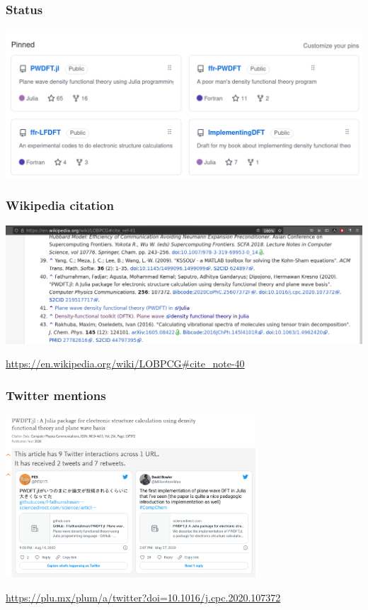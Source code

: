 \begin{frame}
\frametitle{Status}
  
{\centering
\includegraphics[width=\textwidth]{images/Github_ffr.png}
\par}

\end{frame}


\begin{frame}
\frametitle{Wikipedia citation}

{\centering
\includegraphics[width=\textwidth]{images/LOBPCG_wikipedia.png}
\par}

{\footnotesize
\url{https://en.wikipedia.org/wiki/LOBPCG\#cite_note-40}
}

\end{frame}


\begin{frame}
\frametitle{Twitter mentions}

{\centering
\includegraphics[width=0.7\textwidth]{images/Plumx_Tweet.png}
\par}

{\footnotesize
\url{https://plu.mx/plum/a/twitter?doi=10.1016/j.cpc.2020.107372}
}

\end{frame}




